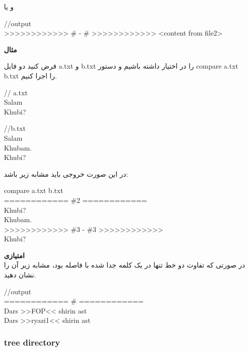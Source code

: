 \documentclass[]{article}
\begin{document}
و یا\\

\begin{latin}
{\mymono
//output\\
>>>>>>>>>>>> \#<start line number> - \#<end line number> >>>>>>>>>>>>
<content from file2>
}
\end{latin}

\textbf{مثال}

فرض کنید دو فایل a.txt و b.txt را در اختیار داشته باشیم و دستور compare a.txt b.txt را اجرا کنیم.
\begin{latin}
{\mymono
// a.txt\\
Salam\\
Khubi?\\
}
\end{latin}
\newpage
\begin{latin}
{\mymono
//b.txt\\
Salam\\
Khubam.\\
Khubi?
}
\end{latin}

در این صورت خروجی باید مشابه زیر باشد:

\begin{latin}
{\mymono
compare a.txt b.txt\\
============  \#2  ============\\
Khubi?\\
Khubam.\\
>>>>>>>>>>>>  \#3 - \#3  >>>>>>>>>>>>\\
Khubi?
}
\end{latin}

\textbf{امتیازی}
\\
در صورتی که تفاوت دو خط تنها در یک کلمه جدا شده با فاصله بود، مشابه زیر آن را نشان دهید.

\begin{latin}
{\mymono
//output\\
============  \#<line number>  ============\\
Dars  >>FOP<< shirin ast\\
Dars >>ryazi1<< shirin ast
}
\end{latin}




\subsubsection*{{\titr tree directory}}
\end{document}
